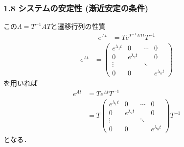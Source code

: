 \documentclass[10pt]{beamer}
\begin{document}
\begin{frame}[t]
\frametitle{1.8 システムの安定性 (漸近安定の条件)}
この$\Lambda = T^{-1} A T$と遷移行列の性質
\begin{align}
 e^{At}           &= T e^{T^{-1}AT t} T^{-1}
 
\end{align}
\begin{align}
 e^{\Lambda t}
 &=
 \left(\begin{array}{cccc}
        e^{\lambda_1 t} & 0               & \cdots & 0 \\
  0               & e^{\lambda_2 t} &        & 0 \\
  \vdots          &                 & \ddots & \\
  0               & 0               &        & e^{\lambda_n t}
       \end{array}\right)
 
\end{align}
を用いれば
\begin{align}
 e^{At}
  &= T e^{\Lambda t} T^{-1} \nonumber \\
 &= T
  \left(\begin{array}{cccc}
         e^{\lambda_1 t} & 0               & \cdots & 0 \\
   0               & e^{\lambda_2 t} &        & 0 \\
   \vdots          &                 & \ddots &   \\
   0               & 0               &        & e^{\lambda_n t}
  \end{array}\right)
  T^{-1}
\end{align}
となる．
\end{frame}
\end{document}
